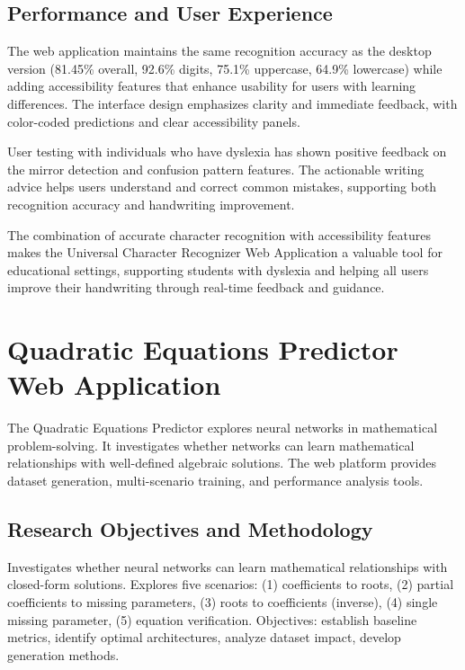\documentclass[11pt,a4paper]{report}
\begin{document}
\subsection{Performance and User Experience}

The web application maintains the same recognition accuracy as the desktop version (81.45\% overall, 92.6\% digits, 75.1\% uppercase, 64.9\% lowercase) while adding accessibility features that enhance usability for users with learning differences. The interface design emphasizes clarity and immediate feedback, with color-coded predictions and clear accessibility panels.

User testing with individuals who have dyslexia has shown positive feedback on the mirror detection and confusion pattern features. The actionable writing advice helps users understand and correct common mistakes, supporting both recognition accuracy and handwriting improvement.

The combination of accurate character recognition with accessibility features makes the Universal Character Recognizer Web Application a valuable tool for educational settings, supporting students with dyslexia and helping all users improve their handwriting through real-time feedback and guidance.

\section{Quadratic Equations Predictor Web Application}

The Quadratic Equations Predictor explores neural networks in mathematical problem-solving. It investigates whether networks can learn mathematical relationships with well-defined algebraic solutions. The web platform provides dataset generation, multi-scenario training, and performance analysis tools.

\subsection{Research Objectives and Methodology}

Investigates whether neural networks can learn mathematical relationships with closed-form solutions. Explores five scenarios: (1) coefficients to roots, (2) partial coefficients to missing parameters, (3) roots to coefficients (inverse), (4) single missing parameter, (5) equation verification. Objectives: establish baseline metrics, identify optimal architectures, analyze dataset impact, develop generation methods.
\end{document}
